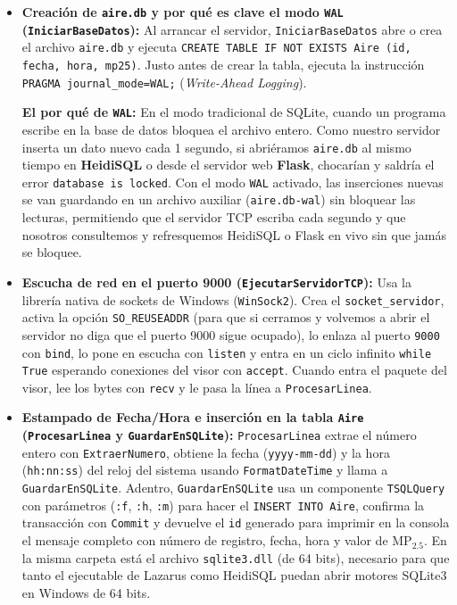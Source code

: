 \documentclass[11pt,a4paper]{article}
\begin{document}
\begin{itemize}[leftmargin=1.5em, itemsep=0.35em]
    \item \textbf{Creación de \texttt{aire.db} y por qué es clave el modo \texttt{WAL} (\texttt{IniciarBaseDatos}):}
    Al arrancar el servidor, \texttt{IniciarBaseDatos} abre o crea el archivo \texttt{aire.db} y ejecuta \texttt{CREATE TABLE IF NOT EXISTS Aire (id, fecha, hora, mp25)}. Justo antes de crear la tabla, ejecuta la instrucción \texttt{PRAGMA journal\_mode=WAL;} (\emph{Write-Ahead Logging}).
    
    \textbf{El por qué de \texttt{WAL}:} En el modo tradicional de SQLite, cuando un programa escribe en la base de datos bloquea el archivo entero. Como nuestro servidor inserta un dato nuevo cada 1 segundo, si abriéramos \texttt{aire.db} al mismo tiempo en \textbf{HeidiSQL} o desde el servidor web \textbf{Flask}, chocarían y saldría el error \texttt{database is locked}. Con el modo \texttt{WAL} activado, las inserciones nuevas se van guardando en un archivo auxiliar (\texttt{aire.db-wal}) sin bloquear las lecturas, permitiendo que el servidor TCP escriba cada segundo y que nosotros consultemos y refresquemos HeidiSQL o Flask en vivo sin que jamás se bloquee.

    \item \textbf{Escucha de red en el puerto 9000 (\texttt{EjecutarServidorTCP}):}
    Usa la librería nativa de sockets de Windows (\texttt{WinSock2}). Crea el \texttt{socket\_servidor}, activa la opción \texttt{SO\_REUSEADDR} (para que si cerramos y volvemos a abrir el servidor no diga que el puerto 9000 sigue ocupado), lo enlaza al puerto \texttt{9000} con \texttt{bind}, lo pone en escucha con \texttt{listen} y entra en un ciclo infinito \texttt{while True} esperando conexiones del visor con \texttt{accept}. Cuando entra el paquete del visor, lee los bytes con \texttt{recv} y le pasa la línea a \texttt{ProcesarLinea}.

    \item \textbf{Estampado de Fecha/Hora e inserción en la tabla \texttt{Aire} (\texttt{ProcesarLinea} y \texttt{GuardarEnSQLite}):}
    \texttt{ProcesarLinea} extrae el número entero con \texttt{ExtraerNumero}, obtiene la fecha (\texttt{yyyy-mm-dd}) y la hora (\texttt{hh:nn:ss}) del reloj del sistema usando \texttt{FormatDateTime} y llama a \texttt{GuardarEnSQLite}. Adentro, \texttt{GuardarEnSQLite} usa un componente \texttt{TSQLQuery} con parámetros (\texttt{:f}, \texttt{:h}, \texttt{:m}) para hacer el \texttt{INSERT INTO Aire}, confirma la transacción con \texttt{Commit} y devuelve el \texttt{id} generado para imprimir en la consola el mensaje completo con número de registro, fecha, hora y valor de $\text{MP}_{2.5}$. En la misma carpeta está el archivo \texttt{sqlite3.dll} (de 64 bits), necesario para que tanto el ejecutable de Lazarus como HeidiSQL puedan abrir motores SQLite3 en Windows de 64 bits.
\end{itemize}
\end{document}
